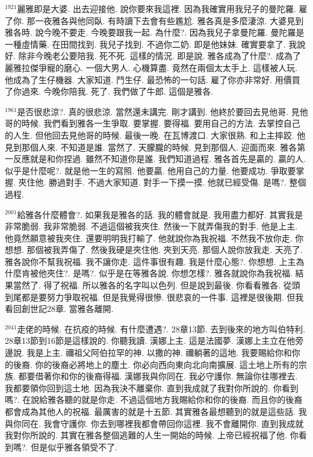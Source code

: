 \documentclass{book}
\begin{document}
$^{1921}$麗雅即是大婆.
出去迎接他.
說你要來我這裡.
因為我確實用我兒子的曼陀羅.
雇了你.
那一夜雅各與他同臥.
有時讀下去會有些尷尬.
雅各真是多麼淒涼.
大婆見到雅各時.
說今晚不要走.
今晚要跟我一起.
為什麼?.
因為我兒子拿曼陀羅.
曼陀羅是一種虛情藥.
在田間找到.
我兒子找到.
不過你二奶.
即是他妹妹.
確實要拿了.
我說好.
除非今晚老公要陪我.
死不死.
這樣的情況.
即是說.
雅各成為了什麼?.
成為了麗雅拉傑爭寵的磨心.
一個大男人.
心機算盡.
竟然在兩個太太手上.
這樣被人玩.
他成為了生仔機器.
大家知道.
鬥生仔.
最恐怖的一句話.
雇了你亦非常好.
用價買了你過來.
今晚你陪我.
死了.
我們做了牛郎.
這個是雅各.

$^{1961}$是否很悲涼?.
真的很悲涼.
當然還未講完.
剛才講到.
他終於要回去見他哥.
見他哥的時候.
我們看到雅各一生爭取.
要掌握.
要得福.
要用自己的方法.
去掌控自己的人生.
但他回去見他哥的時候.
最後一晚.
在瓦博渡口.
大家很熟.
和上主摔跤.
他見到那個人來.
不知道是誰.
當然了.
天朦朧的時候.
見到那個人.
迎面而來.
雅各第一反應就是和你捏過.
雖然不知道你是誰.
我們知道過程.
雅各首先是贏的.
贏的人.
似乎是什麼呢?.
就是他一生的寫照.
他要贏.
他用自己的力量.
他要成功.
爭取要掌握.
夾住他.
勝過對手.
不過大家知道.
對手一下摸一摸.
他就已經受傷.
是嗎?.
整個過程.

$^{2001}$給雅各什麼體會?.
如果我是雅各的話.
我的體會就是.
我用盡力都好.
其實我是非常脆弱.
我非常脆弱.
不過這個被我夾住.
然後一下就弄傷我的對手.
他是上主.
他竟然願意被我夾住.
還要明明我打輸了.
他就說你為我祝福.
不然我不放你走.
你想想.
那個被我弄傷了.
然後我硬是夾住他.
夾到天亮.
那個人說你放我走.
天亮了.
雅各說你不幫我祝福.
我不讓你走.
這件事很有趣.
我是什麼心態?.
你想想.
上主為什麼肯被他夾住?.
是嗎?.
似乎是在等雅各說.
你想怎樣?.
雅各就說你為我祝福.
結果當然了.
得了祝福.
所以雅各的名字叫以色列.
但是說到最後.
你看看雅各.
從頭到尾都是要努力爭取祝福.
但是我覺得很慘.
很悲哀的一件事.
這裡是很後期.
但我看回創世記28章.
當雅各離開.

$^{2041}$走佬的時候.
在抗疫的時候.
有什麼遭遇?.
28章13節.
去到後來的地方叫伯特利.
28章13節到16節是這樣說的.
你聽我讀.
漢娜上主.
這是法國夢.
漢娜上主立在他旁邊說.
我是上主.
禰祖父阿伯拉罕的神.
以撒的神.
禰躺著的這地.
我要賜給你和你的後裔.
你的後裔必將地上的塵土.
你必向西向東向北向南擴展.
這土地上所有的宗族.
都要借著你和你的後裔得福.
漢娜我與你同在.
我必守護你.
無論你往哪裡去.
我都要領你回到這土地.
因為我決不離棄你.
直到我成就了我對你所說的.
你看到嗎?.
在說給雅各聽的就是你走.
不過這個地方我賜給你和你的後裔.
而且你的後裔都會成為其他人的祝福.
最厲害的就是十五節.
其實雅各最想聽到的就是這些話.
我與你同在.
我會守護你.
你去到哪裡我都會帶回你這裡.
我不會離開你.
直到我成就我對你所說的.
其實在雅各整個逃難的人生一開始的時候.
上帝已經祝福了他.
你看到嗎?.
但是似乎雅各領受不了.
\end{document}
